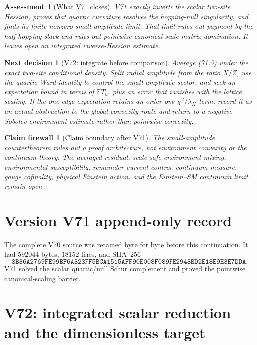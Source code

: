 \documentclass[11pt]{article}
\newtheorem{firewall}[theorem]{Claim firewall}
\newtheorem{decision}[theorem]{Next decision}
\newtheorem{assessment}[theorem]{Assessment}
\theoremstyle{remark}
\begin{document}
\begin{assessment}[What V71 closes]
\label{ass:v17v71-status}
V71 exactly inverts the scalar two-site Hessian, proves that quartic
curvature resolves the hopping-null singularity, and finds its finite
nonzero small-amplitude limit.  That limit rules out payment by the
half-hopping slack and rules out pointwise canonical-scale matrix
domination.  It leaves open an integrated inverse-Hessian estimate.
\end{assessment}

\begin{decision}[V72: integrate before comparison]
\label{dec:v17v71-next}
Average (71.5) under the exact two-site conditional density.  Split
radial amplitude from the ratio \(X/Z\), use the quartic Ward identity
to control the small-amplitude sector, and seek an expectation bound
in terms of \(\mathbb ET_{u^2}\) plus an error that vanishes with the
lattice scaling.  If the one-edge expectation retains an order-one
\(\chi^2/\lambda_H\) term, record it as an actual obstruction to the
global-convexity route and return to a negative-Sobolev environment
estimate rather than pointwise convexity.
\end{decision}

\begin{firewall}[Claim boundary after V71]
\label{fire:v17v71}
The small-amplitude countertheorem rules out a proof architecture, not
environment convexity or the continuum theory.  The averaged residual,
scale-safe environment mixing, environmental susceptibility,
remainder-current control, continuum measure, gauge cofinality,
physical Einstein action, and the Einstein--SM continuum limit remain
open.
\end{firewall}

\section*{Version V71 append-only record}
The complete V70 source was retained byte for byte before this
continuation.  It had \(592044\) bytes, \(18152\) lines, and SHA--256
\[
 \texttt{8B36A2769FE99BF6A323FF5BCA1515AFF90E008F089FE2943BD2E18E9E3E7DDA}.
\]
V71 solved the scalar quartic/null Schur complement and proved the
pointwise canonical-scaling barrier.


\section{V72: integrated scalar reduction and the dimensionless target}
\label{sec:v17v72}
\end{document}
